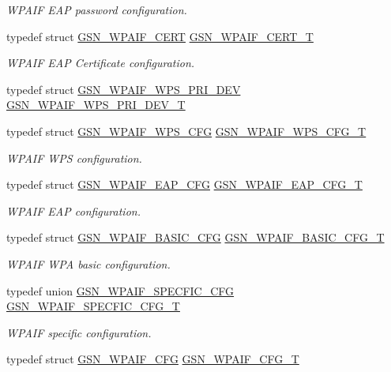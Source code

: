 \begin{DoxyCompactItemize}
\begin{DoxyCompactList}\small\item\em WPAIF EAP password configuration. \end{DoxyCompactList}\item 
typedef struct \hyperlink{a00421}{GSN\_\-WPAIF\_\-CERT} \hyperlink{a00687_ga00bd42b52d889cc88227a999dda345d9}{GSN\_\-WPAIF\_\-CERT\_\-T}
\begin{DoxyCompactList}\small\item\em WPAIF EAP Certificate configuration. \end{DoxyCompactList}\item 
typedef struct \hyperlink{a00428}{GSN\_\-WPAIF\_\-WPS\_\-PRI\_\-DEV} \hyperlink{a00615_a838653f59da3271c858246150315a7b0}{GSN\_\-WPAIF\_\-WPS\_\-PRI\_\-DEV\_\-T}
\item 
typedef struct \hyperlink{a00427}{GSN\_\-WPAIF\_\-WPS\_\-CFG} \hyperlink{a00687_gad51d45617a4ed8eff4b53f1196737959}{GSN\_\-WPAIF\_\-WPS\_\-CFG\_\-T}
\begin{DoxyCompactList}\small\item\em WPAIF WPS configuration. \end{DoxyCompactList}\item 
typedef struct \hyperlink{a00423}{GSN\_\-WPAIF\_\-EAP\_\-CFG} \hyperlink{a00687_gaca9adbc88af0681a3cfbc31eb772a548}{GSN\_\-WPAIF\_\-EAP\_\-CFG\_\-T}
\begin{DoxyCompactList}\small\item\em WPAIF EAP configuration. \end{DoxyCompactList}\item 
typedef struct \hyperlink{a00420}{GSN\_\-WPAIF\_\-BASIC\_\-CFG} \hyperlink{a00687_gae101e1cf8fc4d75a8d0f652d2a4fa298}{GSN\_\-WPAIF\_\-BASIC\_\-CFG\_\-T}
\begin{DoxyCompactList}\small\item\em WPAIF WPA basic configuration. \end{DoxyCompactList}\item 
typedef union \hyperlink{a00426}{GSN\_\-WPAIF\_\-SPECFIC\_\-CFG} \hyperlink{a00687_ga976816e9ade6b55dce10949691396249}{GSN\_\-WPAIF\_\-SPECFIC\_\-CFG\_\-T}
\begin{DoxyCompactList}\small\item\em WPAIF specific configuration. \end{DoxyCompactList}\item 
typedef struct \hyperlink{a00422}{GSN\_\-WPAIF\_\-CFG} \hyperlink{a00687_ga7cc823d929ee57574f3590cd8af66f18}{GSN\_\-WPAIF\_\-CFG\_\-T}

\end{DoxyCompactItemize}
